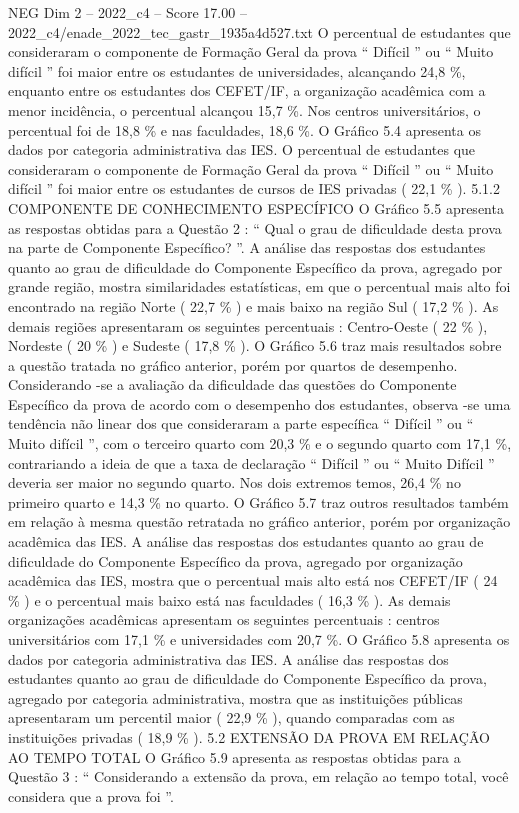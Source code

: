 \begin{textsample}{NEG Dim 2 – 2022\_c4 – Score 17.00 – 2022\_c4/enade\_2022\_tec\_gastr\_1935a4d527.txt}
O percentual de estudantes que consideraram o componente de Formação Geral da prova “ Difícil ” ou “ Muito difícil ” foi maior entre os estudantes de universidades, alcançando 24,8 \%, enquanto entre os estudantes dos CEFET/IF, a organização acadêmica com a menor incidência, o percentual alcançou 15,7 \%.
Nos centros universitários, o percentual foi de 18,8 \% e nas faculdades, 18,6 \%.
O Gráfico 5.4 apresenta os dados por categoria administrativa das IES.
O percentual de estudantes que consideraram o componente de Formação Geral da prova “ Difícil ” ou “ Muito difícil ” foi maior entre os estudantes de cursos de IES privadas ( 22,1 \% ). 5.1.2 COMPONENTE DE CONHECIMENTO ESPECÍFICO O Gráfico 5.5 apresenta as respostas obtidas para a Questão 2 : “ Qual o grau de dificuldade desta prova na parte de Componente Específico? ”.
A análise das respostas dos estudantes quanto ao grau de dificuldade do Componente Específico da prova, agregado por grande região, mostra similaridades estatísticas, em que o percentual mais alto foi encontrado na região Norte ( 22,7 \% ) e mais baixo na região Sul ( 17,2 \% ).
As demais regiões apresentaram os seguintes percentuais : Centro-Oeste ( 22 \% ), Nordeste ( 20 \% ) e Sudeste ( 17,8 \% ).
O Gráfico 5.6 traz mais resultados sobre a questão tratada no gráfico anterior, porém por quartos de desempenho.
Considerando -se a avaliação da dificuldade das questões do Componente Específico da prova de acordo com o desempenho dos estudantes, observa -se uma tendência não linear dos que consideraram a parte específica “ Difícil ” ou “ Muito difícil ”, com o terceiro quarto com 20,3 \% e o segundo quarto com 17,1 \%, contrariando a ideia de que a taxa de declaração “ Difícil ” ou “ Muito Difícil ” deveria ser maior no segundo quarto.
Nos dois extremos temos, 26,4 \% no primeiro quarto e 14,3 \% no quarto.
O Gráfico 5.7 traz outros resultados também em relação à mesma questão retratada no gráfico anterior, porém por organização acadêmica das IES.
A análise das respostas dos estudantes quanto ao grau de dificuldade do Componente Específico da prova, agregado por organização acadêmica das IES, mostra que o percentual mais alto está nos CEFET/IF ( 24 \% ) e o percentual mais baixo está nas faculdades ( 16,3 \% ).
As demais organizações acadêmicas apresentam os seguintes percentuais : centros universitários com 17,1 \% e universidades com 20,7 \%.
O Gráfico 5.8 apresenta os dados por categoria administrativa das IES.
A análise das respostas dos estudantes quanto ao grau de dificuldade do Componente Específico da prova, agregado por categoria administrativa, mostra que as instituições públicas apresentaram um percentil maior ( 22,9 \% ), quando comparadas com as instituições privadas ( 18,9 \% ). 5.2 EXTENSÃO DA PROVA EM RELAÇÃO AO TEMPO TOTAL O Gráfico 5.9 apresenta as respostas obtidas para a Questão 3 : “ Considerando a extensão da prova, em relação ao tempo total, você considera que a prova foi ”.

\end{textsample}
